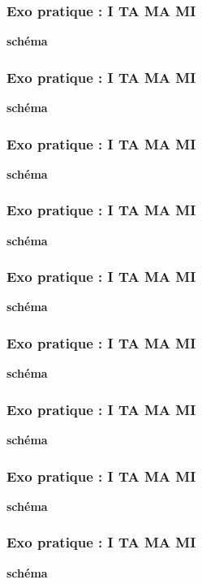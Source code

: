 \documentclass{beamer}
\begin{document}
\begin{frame}
\frametitle{Exo pratique : I TA MA MI}

\textbf{schéma}

\end{frame}

\begin{frame}
\frametitle{Exo pratique : I TA MA MI}

\textbf{schéma}
\end{frame}

\begin{frame}
\frametitle{Exo pratique : I TA MA MI}

\textbf{schéma}
\end{frame}

\begin{frame}
\frametitle{Exo pratique : I TA MA MI}

\textbf{schéma}
\end{frame}

\begin{frame}
\frametitle{Exo pratique : I TA MA MI}

\textbf{schéma}
\end{frame}

\begin{frame}
\frametitle{Exo pratique : I TA MA MI}

\textbf{schéma}
\end{frame}

\begin{frame}
\frametitle{Exo pratique : I TA MA MI}

\textbf{schéma}
\end{frame}

\begin{frame}
\frametitle{Exo pratique : I TA MA MI}

\textbf{schéma}
\end{frame}

\begin{frame}
\frametitle{Exo pratique : I TA MA MI}

\textbf{schéma}
\end{frame}
\end{document}
